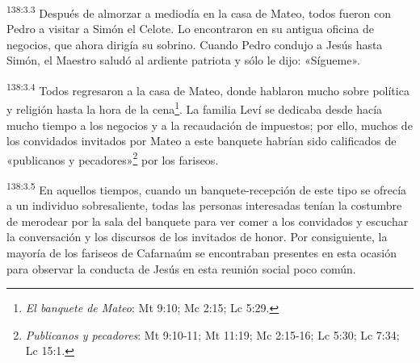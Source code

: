 \par
\textsuperscript{138:3.3} Después de almorzar a mediodía en la casa de Mateo, todos fueron con Pedro a visitar a Simón el Celote. Lo encontraron en su antigua oficina de negocios, que ahora dirigía su sobrino. Cuando Pedro condujo a Jesús hasta Simón, el Maestro saludó al ardiente patriota y sólo le dijo: «Sígueme».

\par
\textsuperscript{138:3.4} Todos regresaron a la casa de Mateo, donde hablaron mucho sobre política y religión hasta la hora de la cena\footnote{\textit{El banquete de Mateo}: Mt 9:10; Mc 2:15; Lc 5:29.}. La familia Leví se dedicaba desde hacía mucho tiempo a los negocios y a la recaudación de impuestos; por ello, muchos de los convidados invitados por Mateo a este banquete habrían sido calificados de «publicanos y pecadores»\footnote{\textit{Publicanos y pecadores}: Mt 9:10-11; Mt 11:19; Mc 2:15-16; Lc 5:30; Lc 7:34; Lc 15:1.} por los fariseos.

\par
\textsuperscript{138:3.5} En aquellos tiempos, cuando un banquete-recepción de este tipo se ofrecía a un individuo sobresaliente, todas las personas interesadas tenían la costumbre de merodear por la sala del banquete para ver comer a los convidados y escuchar la conversación y los discursos de los invitados de honor. Por consiguiente, la mayoría de los fariseos de Cafarnaúm se encontraban presentes en esta ocasión para observar la conducta de Jesús en esta reunión social poco común.

